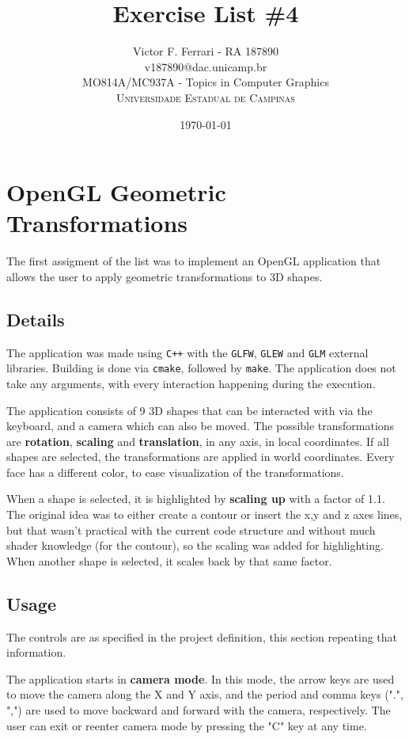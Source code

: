 \documentclass[12pt]{article}
\title{Exercise List \#4} %
\author{Victor F. Ferrari - RA 187890\\ %
v187890@dac.unicamp.br\\
MO814A/MC937A - Topics in Computer Graphics\\ %
\textsc{Universidade Estadual de Campinas}
}
\date{\today} %
\begin{document}
\setlength{\droptitle}{-5em}    
\maketitle


\section{OpenGL Geometric Transformations}

The first assigment of the list was to implement an OpenGL application that allows the user to apply geometric transformations to 3D shapes.

\subsection{Details}
The application was made using \texttt{C++} with the \texttt{GLFW}, \texttt{GLEW} and \texttt{GLM} external libraries. Building is done via \texttt{cmake}, followed by \texttt{make}. The application does not take any arguments, with every interaction happening during the execution.

The application consists of 9 3D shapes that can be interacted with via the keyboard, and a camera which can also be moved. The possible transformations are \textbf{rotation}, \textbf{scaling} and \textbf{translation}, in any axis, in local coordinates. If all shapes are selected, the transformations are applied in world coordinates. Every face has a different color, to ease visualization of the transformations.

When a shape is selected, it is highlighted by \textbf{scaling up} with a factor of 1.1. The original idea was to either create a contour or insert the x,y and z axes lines, but that wasn't practical with the current code structure and without much shader knowledge (for the contour), so the scaling was added for highlighting. When another shape is selected, it scales back by that same factor.

\subsection{Usage}
The controls are as specified in the project definition, this section repeating that information.

The application starts in \textbf{camera mode}. In this mode, the arrow keys are used to move the camera along the X and Y axis, and the period and comma keys (".", ",") are used to move backward and forward with the camera, respectively. The user can exit or reenter camera mode by pressing the "C" key at any time.
\end{document}
